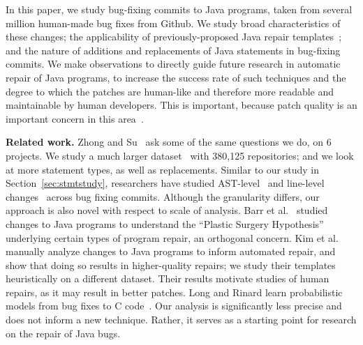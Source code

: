 \documentclass{sig-alternate-05-2015}
\begin{document}
In this paper, we study bug-fixing commits to Java programs, 
taken from several million human-made bug fixes from Github. We study broad
characteristics of these changes; the applicability of previously-proposed
Java repair templates~\cite{kim2013}; and the nature
of additions and replacements of Java statements in bug-fixing commits. We make
observations to directly guide future research in automatic repair of Java
programs, to increase the success rate of such techniques and the degree to
which the patches are human-like and therefore more readable and maintainable by
human developers. This is important, because patch quality is an important
concern in this area~\cite{Qi15}.


\vspace{1ex} \noindent\textbf{Related work.} Zhong and Su~\cite{zhong2015} ask
some of the same questions we do, on 6 projects. We study a much
larger dataset~\cite{dyer2013} with 380,125 repositories; and we look at more
statement types, as well as replacements. Similar to our study in
Section~\ref{sec:stmtstudy}, researchers have 
studied AST-level~\cite{Martinez:2015ez} and line-level
changes~\cite{Asaduzzaman:2013df} across bug fixing commits.
Although the granularity differs, our approach is also novel with respect to scale of
analysis. Barr et al.~\cite{Barr14fse} studied changes to Java programs to
understand the ``Plastic Surgery Hypothesis'' underlying certain types of
program repair, an orthogonal concern. Kim et al.~\cite{kim2013} manually
analyze changes to Java programs to inform automated repair, and
show that doing so results in higher-quality repairs; we study their templates
heuristically on a different dataset. Their results motivate studies of human
repairs, as it may result in better patches.  Long and Rinard learn
probabilistic models from bug fixes to C code~\cite{Long2016}. Our analysis is
significantly less precise and does not inform a new technique.  Rather, it
serves as a starting point for research on the repair of Java bugs.
\end{document}

